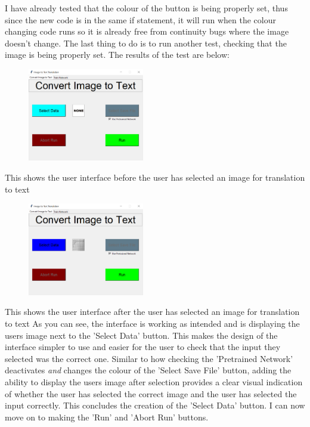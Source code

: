 \documentclass{report}
\begin{document}
\noindent I have already tested that the colour of the button is being properly set, thus since the new code is in the same if statement, it will run when the colour changing code runs so it is already free from continuity bugs where the image doesn't change. The last thing to do is to run another test, checking that the image is being properly set. The results of the test are below:
\begin{figure}[H]
    \centering
    \includegraphics[width=2in]{Images/Development and Testing/Stage 7/Image to Text Conversion Tab/Tests for Select Data Function/Before selecting Image.png}
\end{figure}
\noindent This shows the user interface before the user has selected an image for translation to text
\begin{figure}[H]
    \centering
    \includegraphics[width=2in]{Images/Development and Testing/Stage 7/Image to Text Conversion Tab/Tests for Select Data Function/After selecting Image.png}
\end{figure}
\noindent This shows the user interface after the user has selected an image for translation to text
\newline
\newline
As you can see, the interface is working as intended and is displaying the users image next to the 'Select Data' button. This makes the design of the interface simpler to use and easier for the user to check that the input they selected was the correct one. Similar to how checking the 'Pretrained Network' deactivates \emph{and} changes the colour of the 'Select Save File' button, adding the ability to display the users image after selection provides a clear visual indication of whether the user has selected the correct image and the user has selected the input correctly. 
\newline
This concludes the creation of the 'Select Data' button. I can now move on to making the 'Run' and 'Abort Run' buttons.
\end{document}
